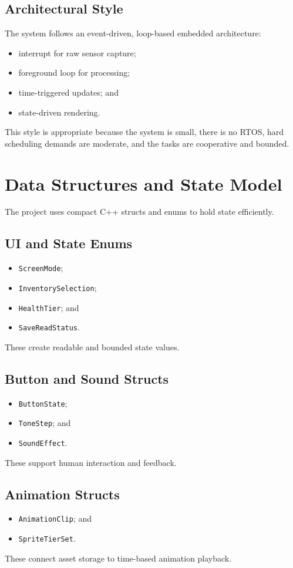 \documentclass[conference]{IEEEtran}
\begin{document}
\subsection{Architectural Style}
The system follows an event-driven, loop-based embedded architecture:
\begin{itemize}
\item interrupt for raw sensor capture;
\item foreground loop for processing;
\item time-triggered updates; and
\item state-driven rendering.
\end{itemize}
This style is appropriate because the system is small, there is no RTOS, hard scheduling demands are moderate, and the tasks are cooperative and bounded.

\section{Data Structures and State Model}
The project uses compact C++ structs and enums to hold state efficiently.

\subsection{UI and State Enums}
\begin{itemize}
\item \texttt{ScreenMode};
\item \texttt{InventorySelection};
\item \texttt{HealthTier}; and
\item \texttt{SaveReadStatus}.
\end{itemize}
These create readable and bounded state values.

\subsection{Button and Sound Structs}
\begin{itemize}
\item \texttt{ButtonState};
\item \texttt{ToneStep}; and
\item \texttt{SoundEffect}.
\end{itemize}
These support human interaction and feedback.

\subsection{Animation Structs}
\begin{itemize}
\item \texttt{AnimationClip}; and
\item \texttt{SpriteTierSet}.
\end{itemize}
These connect asset storage to time-based animation playback.
\end{document}
